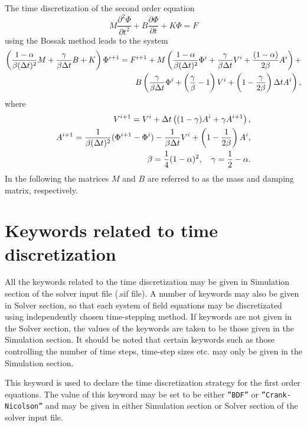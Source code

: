 The time discretization of the second order equation
\begin{equation}\label{EqToTimeDiscretizate2}
M\frac{\partial^2\Phi}{\partial t^2} + B\frac{\partial\Phi}{\partial t} + K\Phi = F
\end{equation}
using the Bossak method leads to the system
%
\begin{equation}
\begin{split}
\left (\frac{1-\alpha}{\beta(\Delta t)^2}M + 
\frac{\gamma}{\beta\Delta t} B + K\right )\Phi^{i+1} =
F^{i+1} + M\left ( \frac{1-\alpha}{\beta(\Delta t)^2} \Phi^{i} + 
\frac{\gamma}{\beta\Delta t}V^i + 
 \frac{(1-\alpha)}{2\beta}A^i\right ) + \cr
B\left (
\frac{\gamma}{\beta\Delta t}\Phi^i + 
\left(\frac{\gamma}{\beta}-1\right)V^i+
\left(1-\frac{\gamma}{2\beta}\right)\Delta tA^i\right), 
\end{split}
\end{equation}
%
where
\begin{equation}
\begin{split}
V^{i+1} = V^i + \Delta t\left ((1-\gamma)A^i+\gamma A^{i+1}\right ), \cr
A^{i+1} = \frac{1}{\beta(\Delta t)^2}(\Phi^{i+1}-\Phi^i)-\frac{1}{\beta\Delta t}V^i+
\left( 1-\frac{1}{2\beta}\right )A^i,  \cr
\beta = \frac{1}{4}(1-\alpha)^2, \quad \gamma = \frac{1}{2} - \alpha.
\end{split}
\end{equation}
In the following the matrices $M$ and $B$ are referred to as the mass and damping
matrix, respectively.


\section{Keywords related to time discretization}

All the keywords related to the time discretization may be given in Simulation section of 
the solver input file (.sif file). A number of keywords may also be given in Solver section,
so that each system of field equations may be discretizated using independently chosen 
time-stepping method.
If keywords are not given in the Solver
section, the values of the keywords are taken to be those given in the Simulation section.
It should be noted that certain keywords such as those controlling the number of time steps, 
time-step sizes etc. may only be given in the Simulation section.

\sifbegin
{}
This keyword is used to declare the time discretization strategy for the 
first order equations. The value of this keyword may be set to be either {\tt ''BDF''}
or {\tt ''Crank-Nicolson''} and may be given in 
either Simulation section or Solver section of the solver input file.

